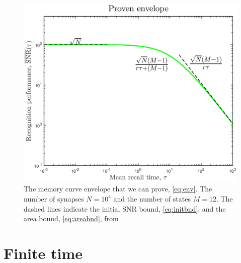 \documentclass[12pt]{article}
\begin{document}
\begin{figure}[tb]
  \centering
  \includegraphics[width=0.8\linewidth]{LenvProven.eps}
  \caption[Proven envelope]{The memory curve envelope that we can prove, \eqref{eq:env}.
  The number of synapses $N=10^4$ and the number of states $M=12$.
  The dashed lines indicate the initial SNR bound, \eqref{eq:initbnd}, and the area bound, \eqref{eq:areabnd}, from \cite{Lahiri2013synapse}.}\label{fig:envproven}
\end{figure}




\section{Finite time}\label{sec:finite}
\end{document}
